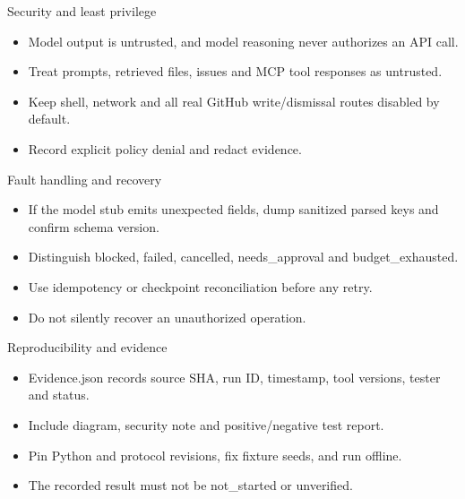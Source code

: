 \documentclass[aspectratio=169,10pt]{beamer}
\begin{document}
\begin{frame}{Security and least privilege}
\small
\begin{itemize}
\item Model output is untrusted, and model reasoning never authorizes an API call.
\item Treat prompts, retrieved files, issues and MCP tool responses as untrusted.
\item Keep shell, network and all real GitHub write/dismissal routes disabled by default.
\item Record explicit policy denial and redact evidence.
\end{itemize}

\end{frame}

\begin{frame}{Fault handling and recovery}
\small
\begin{itemize}
\item If the model stub emits unexpected fields, dump sanitized parsed keys and confirm schema version.
\item Distinguish blocked, failed, cancelled, needs\_approval and budget\_exhausted.
\item Use idempotency or checkpoint reconciliation before any retry.
\item Do not silently recover an unauthorized operation.
\end{itemize}

\end{frame}

\begin{frame}{Reproducibility and evidence}
\small
\begin{itemize}
\item Evidence.json records source SHA, run ID, timestamp, tool versions, tester and status.
\item Include diagram, security note and positive/negative test report.
\item Pin Python and protocol revisions, fix fixture seeds, and run offline.
\item The recorded result must not be not\_started or unverified.
\end{itemize}

\end{frame}
\end{document}
